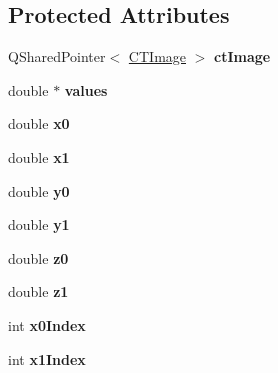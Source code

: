 \subsection*{Protected Attributes}
\begin{DoxyCompactItemize}
\item 
\hypertarget{class_interpolator3_d_a9d6266aaa40a7f84a05d1182cd2c04f4}{
QSharedPointer$<$ \hyperlink{class_c_t_image}{CTImage} $>$ {\bfseries ctImage}}
\label{class_interpolator3_d_a9d6266aaa40a7f84a05d1182cd2c04f4}

\item 
\hypertarget{class_interpolator3_d_a5df530f7c7cbf7058c5d2cf10f3e07cb}{
double $\ast$ {\bfseries values}}
\label{class_interpolator3_d_a5df530f7c7cbf7058c5d2cf10f3e07cb}

\item 
\hypertarget{class_interpolator3_d_a098e01162ac96225406b4cf5b4a987b3}{
double {\bfseries x0}}
\label{class_interpolator3_d_a098e01162ac96225406b4cf5b4a987b3}

\item 
\hypertarget{class_interpolator3_d_a112e63f130456d978f6d22ae29c2e2c4}{
double {\bfseries x1}}
\label{class_interpolator3_d_a112e63f130456d978f6d22ae29c2e2c4}

\item 
\hypertarget{class_interpolator3_d_a2fee0d99437cc2dcfbc2dd5bba6e24ce}{
double {\bfseries y0}}
\label{class_interpolator3_d_a2fee0d99437cc2dcfbc2dd5bba6e24ce}

\item 
\hypertarget{class_interpolator3_d_a444c9f0a4031be34dc6a07d7b2e6b870}{
double {\bfseries y1}}
\label{class_interpolator3_d_a444c9f0a4031be34dc6a07d7b2e6b870}

\item 
\hypertarget{class_interpolator3_d_a2d1d47d5d56abb4c9607250dd831ebc5}{
double {\bfseries z0}}
\label{class_interpolator3_d_a2d1d47d5d56abb4c9607250dd831ebc5}

\item 
\hypertarget{class_interpolator3_d_a1030ce30e84bddce5030b0d859101595}{
double {\bfseries z1}}
\label{class_interpolator3_d_a1030ce30e84bddce5030b0d859101595}

\item 
\hypertarget{class_interpolator3_d_a10209e13e9db8810eeb22a171a74103d}{
int {\bfseries x0Index}}
\label{class_interpolator3_d_a10209e13e9db8810eeb22a171a74103d}

\item 
\hypertarget{class_interpolator3_d_adea831ff1283c09999d2aa5ebcfc2831}{
int {\bfseries x1Index}}
\label{class_interpolator3_d_adea831ff1283c09999d2aa5ebcfc2831}


\end{DoxyCompactItemize}
